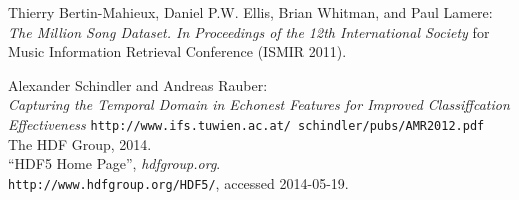 \begin{thebibliography}{10}

Thierry Bertin-Mahieux, Daniel P.W. Ellis, Brian Whitman, and Paul Lamere:\\
\emph{The Million Song Dataset. In Proceedings of the 12th International Society}
for Music Information Retrieval Conference (ISMIR 2011).

Alexander Schindler and Andreas Rauber: \\
\emph{Capturing the Temporal Domain in Echonest Features for Improved Classiffcation Effectiveness}
\texttt{http://www.ifs.tuwien.ac.at/~schindler/pubs/AMR2012.pdf}
The HDF Group,
2014.\\
``HDF5 Home Page'',
\emph{hdfgroup.org}.\\
\verb+http://www.hdfgroup.org/HDF5/+, accessed 2014-05-19.

\end{thebibliography}